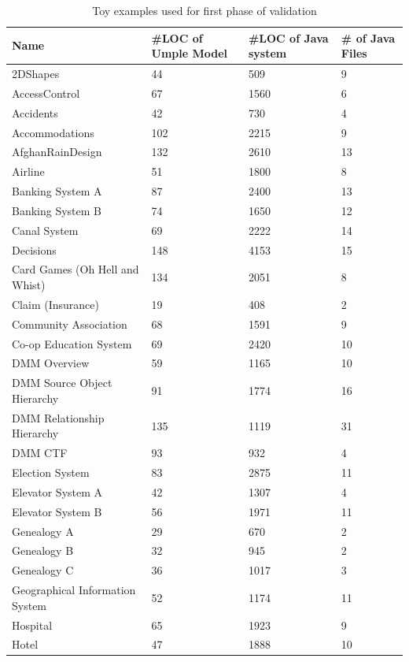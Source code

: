 \begin{table}[h]
\caption{Toy examples used for first phase of validation}
\label{table:umpleexamples}
\begin{tabularx}{\textwidth}{l|YYY}
\toprule
{}
\textbf{Name} & \textbf{\#LOC of Umple Model} & \textbf{\#LOC of Java system} & \textbf{\# of Java Files} \\ \hline
2DShapes & 44 & 509 & 9\\ \hline
AccessControl & 67 & 1560 & 6\\ \hline
Accidents & 42 & 730 & 4\\ \hline
Accommodations & 102 & 2215 & 9\\ \hline
AfghanRainDesign & 132 & 2610 & 13\\ \hline
Airline & 51 & 1800 & 8\\ \hline
Banking System A & 87 & 2400 & 13\\ \hline
Banking System B & 74 & 1650 & 12\\ \hline
Canal System & 69 & 2222 & 14\\ \hline
Decisions & 148 & 4153 & 15\\ \hline
Card Games (Oh Hell and Whist) & 134 & 2051 & 8\\ \hline
Claim (Insurance) & 19 & 408 & 2\\ \hline
Community Association & 68 & 1591 & 9\\ \hline
Co-op Education System & 69 & 2420 & 10\\ \hline
DMM Overview & 59 & 1165 & 10\\ \hline
DMM Source Object Hierarchy & 91 & 1774 & 16\\ \hline
DMM Relationship Hierarchy & 135 & 1119 & 31\\ \hline
DMM CTF & 93 & 932 & 4\\ \hline
Election System & 83 & 2875 & 11\\ \hline
Elevator System A & 42 & 1307 & 4\\ \hline
Elevator System B & 56 & 1971 &11\\ \hline
Genealogy A & 29 & 670 & 2\\ \hline
Genealogy B & 32 & 945 & 2\\ \hline
Genealogy C & 36 & 1017 & 3\\ \hline
Geographical Information System & 52 & 1174 & 11\\ \hline
Hospital & 65 & 1923 & 9\\ \hline
Hotel & 47 & 1888 & 10\\ \hline

\end{tabularx}
\end{table}
